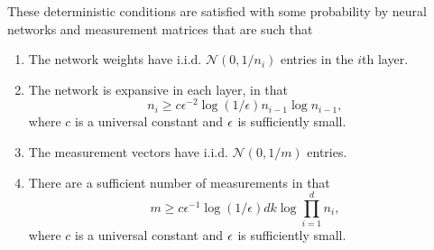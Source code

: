 These deterministic conditions are satisfied with some probability by neural networks and measurement matrices that are such that
\begin{enumerate}[label=(\alph*)]
\item \label{GA:as1} The network weights have i.i.d. $\mathcal{N}(0, 1/n_i)$ entries in the $i$th layer.
\item \label{GA:as2} The network is expansive in each layer, in that
\begin{equation}
\label{eq:condition1}
n_i \geq c \epsilon^{-2} \log(1 / \epsilon) n_{i-1} \log n_{i-1},
\end{equation}
where $c$ is a universal constant and $\epsilon$ is sufficiently small.
\item \label{GA:as3} The measurement vectors have i.i.d. $\mathcal{N}(0, 1/m)$ entries.
\item \label{GA:as4} There are a sufficient number of measurements in that
\begin{equation}
\label{eq:condition2}
m \geq c \epsilon^{-1} \log(1/\epsilon) d k \log \prod_{i = 1}^d n_i,
\end{equation}
where $c$ is a universal constant and $\epsilon$ is sufficiently small.
\end{enumerate}

